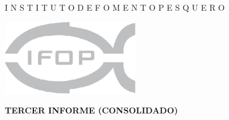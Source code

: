 \documentclass[12pt, oneside]{article} %
\renewcommand{\baselinestretch}{1.2}
\begin{document}
\begin{titlepage}

\renewcommand{\baselinestretch}{1.3}
\null
\large
\begin{center}
\fontsize{12pt}{8pt}\selectfont
{}\uppercase\expandafter{}  I \hspace{0.3pt} N  \hspace{0.3pt} S  \hspace{0.3pt}  T \hspace{0.3pt}   I \hspace{0.3pt}    T \hspace{0.3pt}    U   \hspace{0.3pt}  T  \hspace{0.3pt}  O \hspace{20pt} D  \hspace{0.3pt}  E \hspace{20pt}  F   \hspace{0.3pt} O  \hspace{0.3pt}  M \hspace{0.3pt}   E \hspace{0.3pt}   N  \hspace{0.3pt}  T \hspace{0.3pt}   O  \hspace{20pt}  P \hspace{0.3pt}   E  \hspace{0.3pt}  S \hspace{0.3pt}   Q   \hspace{0.3pt} U  \hspace{0.3pt}  E \hspace{0.3pt}   R  \hspace{0.3pt}  O 
\end{center}
\normalsize


 \hfill  \includegraphics[height=3.2cm]{Figuras/logoIFOPgris_Portada.pdf}

\vspace*{0.5cm} 

\centering \fontsize{14pt}{8pt}\selectfont
            \vspace*{1mm} 
            \hfill \textbf{TERCER INFORME (CONSOLIDADO) }
        

\end{titlepage}
\end{document}
